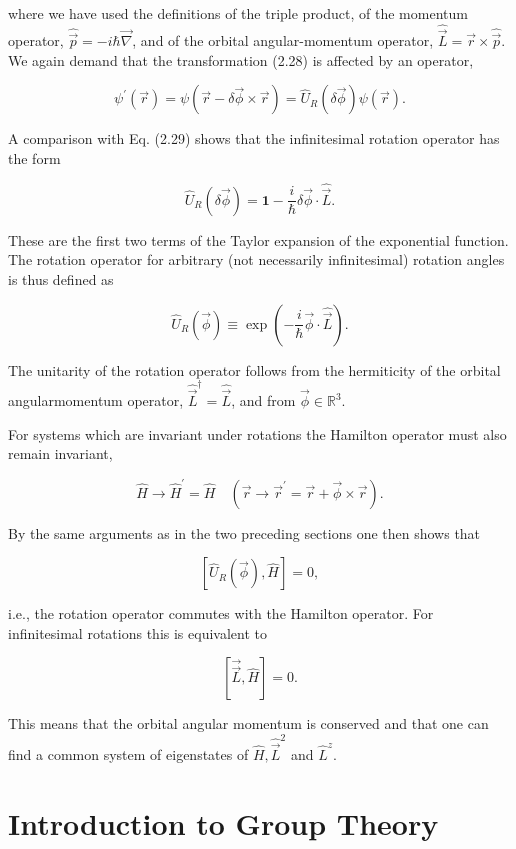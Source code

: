 \documentclass[10pt, letterpaper]{article}
\begin{document}
where we have used the definitions of the triple product, of the momentum operator, $\hat{\vec{p}}=-i \hbar \vec{\nabla}$, and of the orbital angular-momentum operator, $\hat{\vec{L}}=\vec{r} \times \hat{\vec{p}}$. We again demand that the transformation (2.28) is affected by an operator,

$$
\psi^{\prime}(\vec{r})=\psi(\vec{r}-\delta \vec{\phi} \times \vec{r})=\hat{U}_{R}(\delta \vec{\phi}) \psi(\vec{r}) .
$$

A comparison with Eq. (2.29) shows that the infinitesimal rotation operator has the form

$$
\hat{U}_{R}(\delta \vec{\phi})=\mathbf{1}-\frac{i}{\hbar} \delta \vec{\phi} \cdot \hat{\vec{L}} .
$$

These are the first two terms of the Taylor expansion of the exponential function. The rotation operator for arbitrary (not necessarily infinitesimal) rotation angles is thus defined as

$$
\hat{U}_{R}(\vec{\phi}) \equiv \exp \left(-\frac{i}{\hbar} \vec{\phi} \cdot \hat{\vec{L}}\right) .
$$

The unitarity of the rotation operator follows from the hermiticity of the orbital angularmomentum operator, $\hat{\vec{L}}^{\dagger}=\hat{\vec{L}}$, and from $\vec{\phi} \in \mathbb{R}^{3}$.

For systems which are invariant under rotations the Hamilton operator must also remain invariant,

$$
\hat{H} \longrightarrow \hat{H}^{\prime}=\hat{H} \quad\left(\vec{r} \longrightarrow \vec{r}^{\prime}=\vec{r}+\vec{\phi} \times \vec{r}\right) .
$$

By the same arguments as in the two preceding sections one then shows that

$$
\left[\hat{U}_{R}(\vec{\phi}), \hat{H}\right]=0,
$$

i.e., the rotation operator commutes with the Hamilton operator. For infinitesimal rotations this is equivalent to

$$
[\overrightarrow{\vec{L}}, \hat{H}]=0 .
$$

This means that the orbital angular momentum is conserved and that one can find a common system of eigenstates of $\hat{H}, \hat{\vec{L}}^{2}$ and $\hat{L}^{z}$.



\pagebreak

\section{Introduction to Group Theory}
\end{document}
